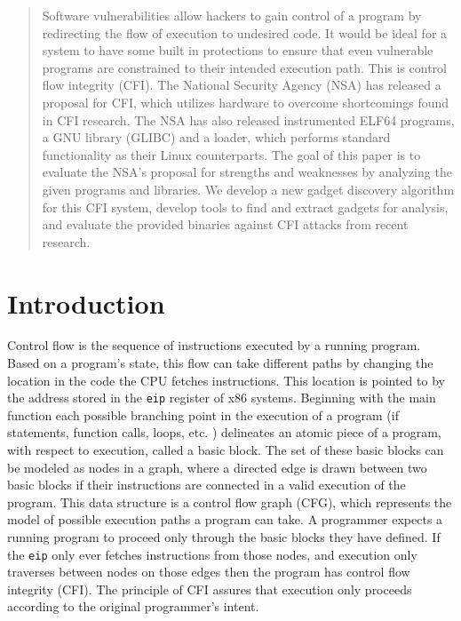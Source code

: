 \documentclass[conference,compsoc]{IEEEtran}
\begin{document}
\begin{abstract}
Software vulnerabilities allow hackers to gain control of a program by redirecting the flow of execution to undesired code. It would be ideal for a system to have some built in protections to ensure that even vulnerable programs are constrained to their intended execution path. This is control flow integrity (CFI). The National Security Agency (NSA) has released a proposal for CFI, which utilizes hardware to overcome shortcomings found in CFI research. The NSA has also released instrumented ELF64 programs, a GNU library (GLIBC) and a loader, which performs standard functionality as their Linux counterparts. The goal of this paper is to evaluate the NSA's proposal for strengths and weaknesses by analyzing the given programs and libraries. We develop a new gadget discovery algorithm for this CFI system, develop tools to find and extract gadgets for analysis, and evaluate the provided binaries against CFI attacks from recent research.

\end{abstract}



\section{Introduction}
Control flow is the sequence of instructions executed by a running program. Based on a program’s state, this flow can take different paths by changing the location in the code the CPU fetches instructions. This location is pointed to by the address stored in the \texttt{eip} register of x86 systems. Beginning with the main function each possible branching point in the execution of a program (if statements, function calls, loops, etc. ) delineates an atomic piece of a program, with respect to execution, called a basic block. The set of these basic blocks can be modeled as nodes in a graph, where a directed edge is drawn between two basic blocks if their instructions are connected in a valid execution of the program. This data structure is a control flow graph (CFG), which represents the model of possible execution paths a program can take. A programmer expects a running program to proceed only through the basic blocks they have defined. If the \texttt{eip} only ever fetches instructions from those nodes, and execution only traverses between nodes on those edges then the program has control flow integrity (CFI). The principle of CFI assures that execution only proceeds according to the original programmer's intent.
\end{document}
